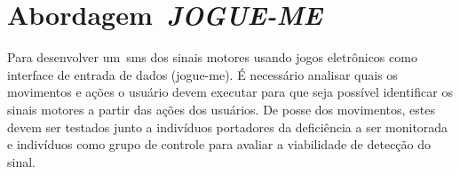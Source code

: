 \chapter{Abordagem~\textit{JOGUE-ME}}\label{chapter:abordagem_gahme}
Para desenvolver um~\ac{sms} dos sinais motores usando jogos eletrônicos como interface de entrada de dados (\ac{jogue-me}). É necessário analisar quais os movimentos e ações o usuário devem executar para que seja possível identificar os sinais motores a partir das ações dos usuários. De posse dos movimentos, estes devem ser testados junto a indivíduos portadores da deficiência a ser monitorada e indivíduos como grupo de controle para avaliar a viabilidade de detecção do sinal.






%


